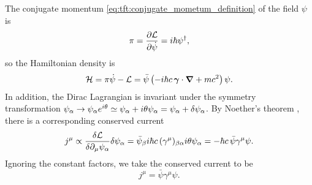The conjugate momentum \eqref{eq:tft:conjugate_mometum_definition} of the field $\psi$ is
\begin{equation}
	\pi = \pdv{\mathcal{L}}{\dot{\psi}} = i \hbar \psi^\dagger ,
\end{equation}
so the Hamiltonian density is
\begin{equation}
	\mathcal{H} = \pi \dot\psi - \mathcal{L} = \bar\psi \left( -i \hbar c \, {\bm{\gamma}} \cdot {\bm{\nabla}} + m c^2 \right) \psi .
\label{eq:tft:dirac_hamiltonian}
\end{equation}
In addition, the Dirac Lagrangian is invariant under the symmetry transformation $\psi_\alpha \rightarrow \psi_\alpha e^{i \theta} \simeq \psi_\alpha + i \theta \psi_\alpha = \psi_\alpha + \delta\psi_\alpha$.
By Noether's theorem \cite[equation 5.7]{ref:kachelriess}, there is a corresponding conserved current
\begin{equation}
	j^\mu \propto \fdv{\lagr}{\partial_\mu \psi_\alpha} \delta \psi_\alpha = \bar\psi_\beta i \hbar c \, (\gamma^\mu)_{\beta \alpha} i \theta \psi_\alpha = - \hbar c \, \bar\psi \gamma^\mu \psi .
\end{equation}
Ignoring the constant factors, we take the conserved current to be
\begin{equation}
	j^\mu = \bar\psi \gamma^\mu \psi .
\label{eq:tft:dirac_conserved_current}
\end{equation}


